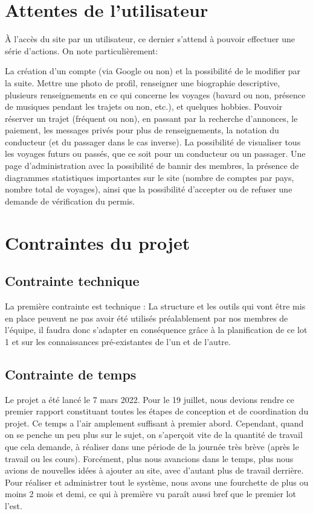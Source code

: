 \section{Attentes de l'utilisateur}

À l'accès du site par un utilisateur, ce dernier s'attend à pouvoir effectuer une série d'actions. On note particulièrement:

La création d'un compte (via Google ou non) et la possibilité de le modifier par la suite. Mettre une photo de profil, renseigner une biographie descriptive, plusieurs renseignements en ce qui concerne les voyages (bavard ou non, présence de musiques pendant les trajets ou non, etc.), et quelques hobbies.
Pouvoir réserver un trajet (fréquent ou non), en passant par la recherche d'annonces, le paiement, les messages privés pour plus de renseignements, la notation du conducteur (et du passager dans le cas inverse).
La possibilité de visualiser tous les voyages futurs ou passés, que ce soit pour un conducteur ou un passager.
Une page d'administration avec la possibilité de bannir des membres, la présence de diagrammes statistiques importantes sur le site (nombre de comptes par pays, nombre total de voyages), ainsi que la possibilité d'accepter ou de refuser une demande de vérification du permis.

\section{Contraintes du projet}

\subsection{Contrainte technique}
\label{Contrainte technique}

La première contrainte est technique : La structure et les outils qui vont être mis en place peuvent ne pas avoir été utilisés préalablement par nos membres de l'équipe, il faudra donc s'adapter en conséquence grâce à la planification de ce lot 1 et sur les connaissances pré-existantes de l'un et de l'autre.

\subsection{Contrainte de temps}
\label{Contrainte de temps}

Le projet a été lancé le 7 mars 2022. Pour le 19 juillet, nous devions rendre ce premier rapport constituant toutes les étapes de conception et de coordination du projet. Ce temps a l'air amplement suffisant à premier abord. Cependant, quand on se penche un peu plus sur le sujet, on s'aperçoit vite de la quantité de travail que cela demande, à réaliser dans une période de la journée très brève (après le travail ou les cours). Forcément, plus nous avancions dans le temps, plus nous avions de nouvelles idées à ajouter au site, avec d'autant plus de travail derrière. Pour réaliser et administrer tout le système, nous avons une fourchette de plus ou moins 2 mois et demi, ce qui à première vu paraît aussi bref que le premier lot l'est.

